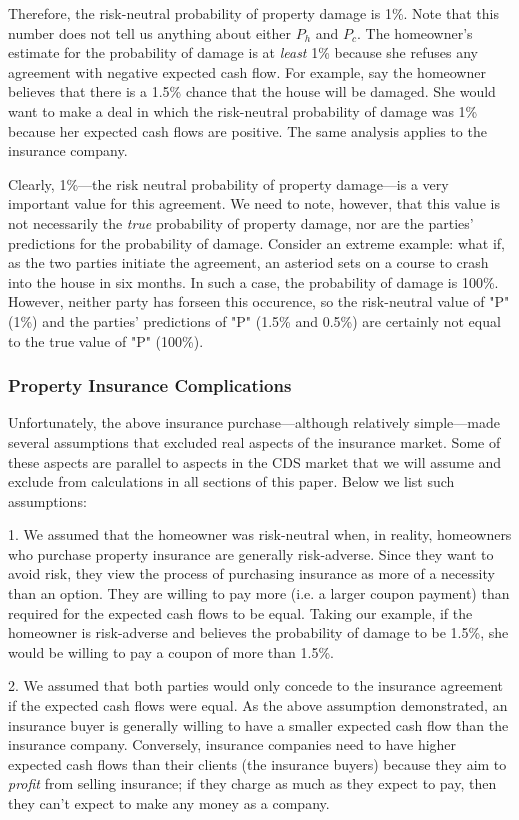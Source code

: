\documentclass[article]{jss}
\begin{document}
Therefore, the risk-neutral probability of property damage is 1\%. Note that this number does not tell us anything about either $P_h$ and $P_c$. The homeowner's estimate for the probability of damage is at \emph{least} 1\% because she refuses any agreement with negative expected cash flow. For example, say the homeowner believes that there is a 1.5\% chance that the house will be damaged. She would want to make a deal in which the risk-neutral probability of damage was 1\% because her expected cash flows are positive.  The same analysis applies to the insurance company. 

Clearly, 1\%---the risk neutral probability of property damage---is a very important value for this agreement. We need to note, however, that this value is not necessarily the \emph{true} probability of property damage, nor are the parties' predictions for the probability of damage. Consider an extreme example: what if, as the two parties initiate the agreement, an asteriod sets on a course to crash into the house in six months. In such a case, the probability of damage is 100\%. However, neither party has forseen this occurence, so the risk-neutral value of "P" (1\%) and the parties' predictions of "P" (1.5\% and 0.5\%) are certainly not equal to the true value of "P" (100\%).

\subsubsection{Property Insurance Complications}
\label{sec:PIComplications}

Unfortunately, the above insurance purchase---although relatively simple---made several assumptions that excluded real aspects of the insurance market. Some of these aspects are parallel to aspects in the CDS market that we will assume and exclude from calculations in all sections of this paper. Below we list such assumptions:

1. We assumed that the homeowner was risk-neutral when, in reality, homeowners who purchase property insurance are generally risk-adverse. Since they want to avoid risk, they view the process of purchasing insurance as more of a necessity than an option. They are willing to pay more (i.e. a larger coupon payment) than required for the expected cash flows to be equal. Taking our example, if the homeowner is risk-adverse and believes the probability of damage to be 1.5\%, she would be willing to pay a coupon of more than 1.5\%.

2. We assumed that both parties would only concede to the insurance agreement if the expected cash flows were equal. As the above assumption demonstrated, an insurance buyer is generally willing to have a smaller expected cash flow than the insurance company. Conversely, insurance companies need to have higher expected cash flows than their clients (the insurance buyers) because they aim to \emph{profit} from selling insurance; if they charge as much as they expect to pay, then they can't expect to make any money as a company. 
\end{document}
